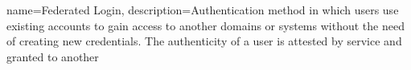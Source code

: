  {
    name={Federated Login},
    description={Authentication method in which users use existing accounts to gain access to another domains or systems
    without the need of creating new credentials. The authenticity of a user is attested by service and granted to another 
    \cite{refonline:MRFL}}
}








    
    \tableofcontents
    \newpage
    \clearpage
    \printglossary[type=acronym,title=Abbreviations,toctitle=Abbreviations]
    \clearpage
    \newpage
    \clearpage
    \printglossary[title=Glossary,toctitle=Glossary]
    \clearpage
    
    
    
    
    \nocite{*}
    
    
        
